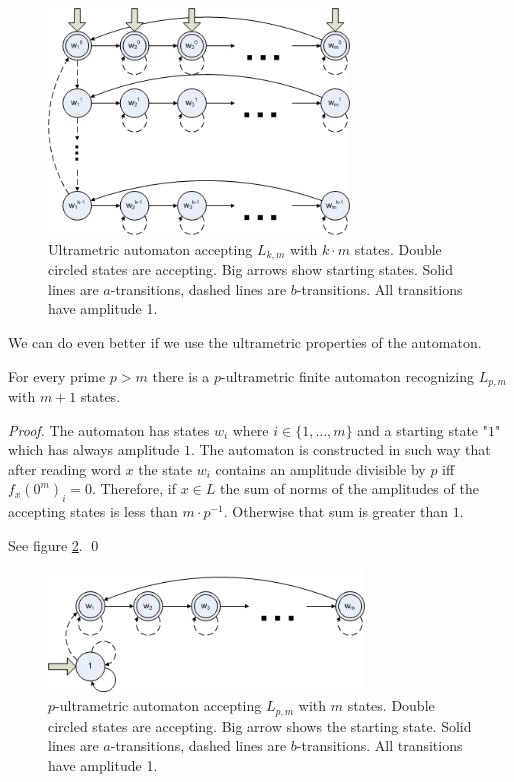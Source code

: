 \documentclass{llncs}
\begin{document}
\begin{figure}[H]
  \centering
  \includegraphics[width = 8cm]{autom_km.png}
  \caption{Ultrametric automaton accepting $L_{k,m}$ with $k \cdot m$ states.
  Double circled states are accepting.
  Big arrows show starting states.
  Solid lines are $a$-transitions, dashed lines are $b$-transitions.
  All transitions have amplitude 1. }
  \label{autom1}
\end{figure}

We can do even better if we use the ultrametric properties of the automaton.

\begin{theorem}
For every prime $p > m$ there is a $p$-ultrametric finite automaton recognizing $L_{p,m}$ with $m+1$ states.
\end{theorem}
\begin{proof}
The automaton has states $w_i$ where $i \in \{1, \ldots, m\}$ and a starting state "$1$" which has always amplitude $1$.
The automaton is constructed in such way that after reading word $x$ the state $w_i$ contains an amplitude divisible by $p$ iff $f_x(0^m)_i = 0$.
Therefore, if $x \in L$ the sum of norms of the amplitudes of the accepting states is less than $m \cdot p^{-1}$. Otherwise that sum is greater than $1$.

See figure \ref{autom2}.
\qed
\end{proof}


\begin{figure}[H]
  \centering
  \includegraphics[width = 8.4cm]{autom_m1.png}
  \caption{$p$-ultrametric automaton accepting $L_{p,m}$ with $m$ states.
  Double circled states are accepting.
  Big arrow shows the starting state.
  Solid lines are $a$-transitions, dashed lines are $b$-transitions.
  All transitions have amplitude 1. }
  \label{autom2}
\end{figure}
\end{document}
